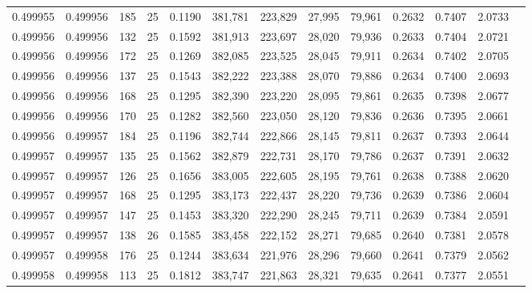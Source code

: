 \begin{tabular}{rrrrrrrrrrrrr}
0.499955 & 0.499956 &   185 &  25 &                                     0.1190 & 381,781 & 223,829 &  27,995 &  79,961 & 0.2632 & 0.7407 & 2.0733 \\
0.499956 & 0.499956 &   132 &  25 &                                     0.1592 & 381,913 & 223,697 &  28,020 &  79,936 & 0.2633 & 0.7404 & 2.0721 \\
0.499956 & 0.499956 &   172 &  25 &                                     0.1269 & 382,085 & 223,525 &  28,045 &  79,911 & 0.2634 & 0.7402 & 2.0705 \\
0.499956 & 0.499956 &   137 &  25 &                                     0.1543 & 382,222 & 223,388 &  28,070 &  79,886 & 0.2634 & 0.7400 & 2.0693 \\
0.499956 & 0.499956 &   168 &  25 &                                     0.1295 & 382,390 & 223,220 &  28,095 &  79,861 & 0.2635 & 0.7398 & 2.0677 \\
0.499956 & 0.499956 &   170 &  25 &                                     0.1282 & 382,560 & 223,050 &  28,120 &  79,836 & 0.2636 & 0.7395 & 2.0661 \\
0.499956 & 0.499957 &   184 &  25 &                                     0.1196 & 382,744 & 222,866 &  28,145 &  79,811 & 0.2637 & 0.7393 & 2.0644 \\
0.499957 & 0.499957 &   135 &  25 &                                     0.1562 & 382,879 & 222,731 &  28,170 &  79,786 & 0.2637 & 0.7391 & 2.0632 \\
0.499957 & 0.499957 &   126 &  25 &                                     0.1656 & 383,005 & 222,605 &  28,195 &  79,761 & 0.2638 & 0.7388 & 2.0620 \\
0.499957 & 0.499957 &   168 &  25 &                                     0.1295 & 383,173 & 222,437 &  28,220 &  79,736 & 0.2639 & 0.7386 & 2.0604 \\
0.499957 & 0.499957 &   147 &  25 &                                     0.1453 & 383,320 & 222,290 &  28,245 &  79,711 & 0.2639 & 0.7384 & 2.0591 \\
0.499957 & 0.499957 &   138 &  26 &                                     0.1585 & 383,458 & 222,152 &  28,271 &  79,685 & 0.2640 & 0.7381 & 2.0578 \\
0.499957 & 0.499958 &   176 &  25 &                                     0.1244 & 383,634 & 221,976 &  28,296 &  79,660 & 0.2641 & 0.7379 & 2.0562 \\
0.499958 & 0.499958 &   113 &  25 &                                     0.1812 & 383,747 & 221,863 &  28,321 &  79,635 & 0.2641 & 0.7377 & 2.0551 \\

\end{tabular}
